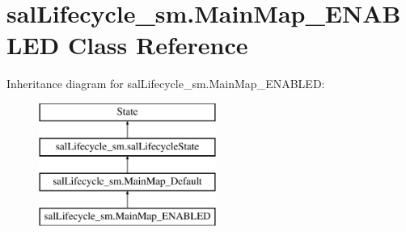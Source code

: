 \hypertarget{classsal_lifecycle__sm_1_1_main_map___e_n_a_b_l_e_d}{\section{sal\-Lifecycle\-\_\-sm.\-Main\-Map\-\_\-\-E\-N\-A\-B\-L\-E\-D Class Reference}
\label{classsal_lifecycle__sm_1_1_main_map___e_n_a_b_l_e_d}
}
Inheritance diagram for sal\-Lifecycle\-\_\-sm.\-Main\-Map\-\_\-\-E\-N\-A\-B\-L\-E\-D\-:\begin{figure}[H]
\begin{center}
\leavevmode
\includegraphics[height=4.000000cm]{classsal_lifecycle__sm_1_1_main_map___e_n_a_b_l_e_d}
\end{center}
\end{figure}
